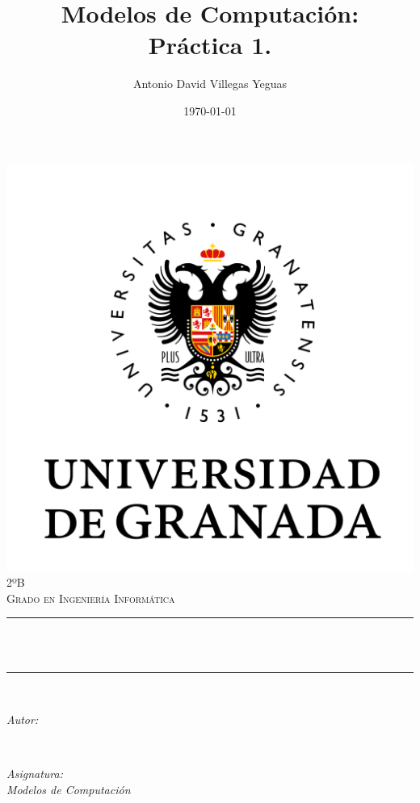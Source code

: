 \documentclass[12pt, spanish]{article}
\title{Modelos de Computación:\\
Práctica 1. \hspace{0.05cm} }
\author{Antonio David Villegas Yeguas}
\date{\today}
\makeatletter
\let\thetitle\@title
\let\theauthor\@author
\let\thedate\@date
\makeatother
\begin{document}

\begin{titlepage}
    \centering
    \vspace*{0.5 cm}
    \includegraphics[scale = 0.50]{ugr.png}\\[1.0 cm]
    \textsc{\large 2ºB}\\[0.5 cm]            
    \textsc{\large Grado en Ingeniería Informática}\\[0.5 cm]              
    \rule{\linewidth}{0.2 mm} \\[0.4 cm]
    { \huge \bfseries \thetitle}\\
    \rule{\linewidth}{0.2 mm} \\[1.5 cm]
    
    \begin{minipage}{0.4\textwidth}
        \begin{flushleft} \large
            \emph{Autor:}\\
            \theauthor
            \end{flushleft}
            \end{minipage}~
            \begin{minipage}{0.4\textwidth}
            \begin{flushright} \large
            \emph{Asignatura: \\
            Modelos de Computación}                   
        \end{flushright}
    \end{minipage}\\[1 cm]
  	
    {\large \thedate}\\[1 cm]
    {\doclicenseThis}
 	
    \vfill
    
\end{titlepage}
\end{document}
